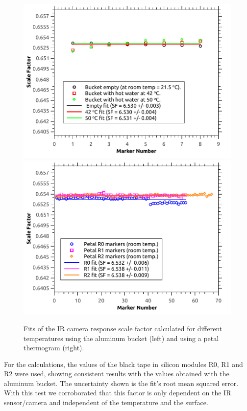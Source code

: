 		\begin{figure}[H]
			\centering
			\captionsetup{justification=centering,margin=2cm}
			\includegraphics[scale=0.5]{Figures/Chapter03/BucketScaleFactors.pdf}
			\includegraphics[scale=0.5]{Figures/Chapter03/PetalScaleFactors.pdf}
			\caption{Fits of the IR camera response scale factor calculated for different temperatures using the aluminum bucket (left) and using a petal thermogram (right).}\label{fig3.4}
		\end{figure}
		
		For the calculations, the values of the black tape in silicon modules R0, R1 and R2 were used, showing consistent results with the values obtained with the aluminum bucket. The uncertainty shown is the fit’s root mean squared error. With this test we corroborated that this factor is only dependent on the IR sensor/camera and independent of the temperature and the surface.\bigskip
		
		
		

	